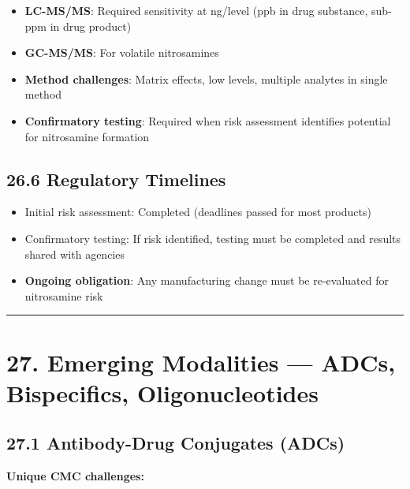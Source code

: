 \documentclass[
  11pt,
  a4paper,
]{report}
\providecommand{\tightlist}{%
  \setlength{\itemsep}{0pt}\setlength{\parskip}{0pt}}
\begin{document}
\begin{itemize}
\tightlist
\item
  \textbf{LC-MS/MS}: Required sensitivity at ng/level (ppb in drug
  substance, sub-ppm in drug product)
\item
  \textbf{GC-MS/MS}: For volatile nitrosamines
\item
  \textbf{Method challenges}: Matrix effects, low levels, multiple
  analytes in single method
\item
  \textbf{Confirmatory testing}: Required when risk assessment
  identifies potential for nitrosamine formation
\end{itemize}

\hypertarget{regulatory-timelines}{%
\subsection{26.6 Regulatory Timelines}\label{regulatory-timelines}}

\begin{itemize}
\tightlist
\item
  Initial risk assessment: Completed (deadlines passed for most
  products)
\item
  Confirmatory testing: If risk identified, testing must be completed
  and results shared with agencies
\item
  \textbf{Ongoing obligation}: Any manufacturing change must be
  re-evaluated for nitrosamine risk
\end{itemize}

\begin{center}\rule{0.5\linewidth}{0.5pt}\end{center}

\hypertarget{emerging-modalities-adcs-bispecifics-oligonucleotides}{%
\section{27. Emerging Modalities --- ADCs, Bispecifics,
Oligonucleotides}\label{emerging-modalities-adcs-bispecifics-oligonucleotides}}

\hypertarget{antibody-drug-conjugates-adcs}{%
\subsection{27.1 Antibody-Drug Conjugates
(ADCs)}\label{antibody-drug-conjugates-adcs}}

\textbf{Unique CMC challenges:}
\end{document}
